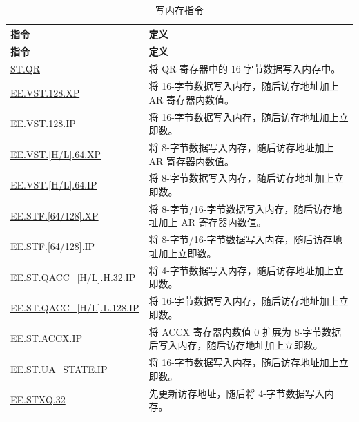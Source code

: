 \begin{longtable}[c]{|l|m{11cm}|}
    \caption{写内存指令}
    \label{tab:pie-store-instructions}\\
    \hline
    \rowcolor{lightgray}
        \textbf{指令} & \textbf{定义} \\\hline
    \endfirsthead
    \rowcolor{lightgray}
    \textbf{指令} & \textbf{定义} \\\hline
    \endhead
    \endfoot
    
    \hyperref[instruction:STQR]{ST.QR} & 将 QR 寄存器中的 16-字节数据写入内存中。
    \\\hline
    \hyperref[instruction:EEVST128XP]{EE.VST.128.XP} & 将 16-字节数据写入内存，随后访存地址加上 AR 寄存器内数值。
    \\\hline
    \hyperref[instruction:EEVST128IP]{EE.VST.128.IP} & 将 16-字节数据写入内存，随后访存地址加上立即数。
    \\\hline
    \hyperref[instruction:EEVSTH64XP]{EE.VST.[H/L].64.XP} & 将 8-字节数据写入内存，随后访存地址加上 AR 寄存器内数值。
    \\\hline
    \hyperref[instruction:EEVSTH64IP]{EE.VST.[H/L].64.IP} & 将 8-字节数据写入内存，随后访存地址加上立即数。
    \\\hline
    \hyperref[instruction:EESTF64XP]{EE.STF.[64/128].XP} & 将 8-字节/16-字节数据写入内存，随后访存地址加上 AR 寄存器内数值。
    \\\hline
    \hyperref[instruction:EESTF64IP]{EE.STF.[64/128].IP} & 将 8-字节/16-字节数据写入内存，随后访存地址加上立即数。
    \\\hline 
    \hyperref[instruction:EESTQACCHH32IP]{EE.ST.QACC\_[H/L].H.32.IP} & 将 4-字节数据写入内存，随后访存地址加上立即数。
    \\\hline
    \hyperref[instruction:EESTQACCHL128IP]{EE.ST.QACC\_[H/L].L.128.IP} & 将 16-字节数据写入内存，随后访存地址加上立即数。
    \\\hline
    \hyperref[instruction:EESTACCXIP]{EE.ST.ACCX.IP} & 将 ACCX 寄存器内数值 0 扩展为 8-字节数据后写入内存，随后访存地址加上立即数。
    \\\hline
    \hyperref[instruction:EESTUASTATEIP]{EE.ST.UA\_STATE.IP} & 将 16-字节数据写入内存，随后访存地址加上立即数。
    \\\hline
    \hyperref[instruction:EESTXQ32]{EE.STXQ.32} & 先更新访存地址，随后将 4-字节数据写入内存。
    \\\hline
\end{longtable}